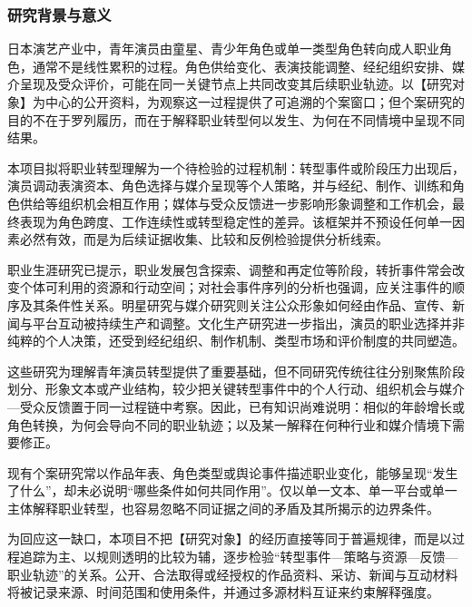 \justifying
\NSFCBodyText

\subsubsection{研究背景与意义}

日本演艺产业中，青年演员由童星、青少年角色或单一类型角色转向成人职业角色，通常不是线性累积的过程。角色供给变化、表演技能调整、经纪组织安排、媒介呈现及受众评价，可能在同一关键节点上共同改变其后续职业轨迹。以【研究对象】为中心的公开资料，为观察这一过程提供了可追溯的个案窗口；但个案研究的目的不在于罗列履历，而在于解释职业转型何以发生、为何在不同情境中呈现不同结果。

本项目拟将职业转型理解为一个待检验的过程机制：转型事件或阶段压力出现后，演员调动表演资本、角色选择与媒介呈现等个人策略，并与经纪、制作、训练和角色供给等组织机会相互作用；媒体与受众反馈进一步影响形象调整和工作机会，最终表现为角色跨度、工作连续性或转型稳定性的差异。该框架并不预设任何单一因素必然有效，而是为后续证据收集、比较和反例检验提供分析线索。

职业生涯研究已提示，职业发展包含探索、调整和再定位等阶段，转折事件常会改变个体可利用的资源和行动空间；对社会事件序列的分析也强调，应关注事件的顺序及其条件性关系\cite{Abbott1983}。明星研究与媒介研究则关注公众形象如何经由作品、宣传、新闻与平台互动被持续生产和调整。文化生产研究进一步指出，演员的职业选择并非纯粹的个人决策，还受到经纪组织、制作机制、类型市场和评价制度的共同塑造。

这些研究为理解青年演员转型提供了重要基础，但不同研究传统往往分别聚焦阶段划分、形象文本或产业结构，较少把关键转型事件中的个人行动、组织机会与媒介---受众反馈置于同一过程链中考察。因此，已有知识尚难说明：相似的年龄增长或角色转换，为何会导向不同的职业轨迹；以及某一解释在何种行业和媒介情境下需要修正。

现有个案研究常以作品年表、角色类型或舆论事件描述职业变化，能够呈现“发生了什么”，却未必说明“哪些条件如何共同作用”。仅以单一文本、单一平台或单一主体解释职业转型，也容易忽略不同证据之间的矛盾及其所揭示的边界条件。

为回应这一缺口，本项目不把【研究对象】的经历直接等同于普遍规律，而是以过程追踪为主、以规则透明的比较为辅，逐步检验“转型事件---策略与资源---反馈---职业轨迹”的关系。公开、合法取得或经授权的作品资料、采访、新闻与互动材料将被记录来源、时间范围和使用条件，并通过多源材料互证来约束解释强度。

